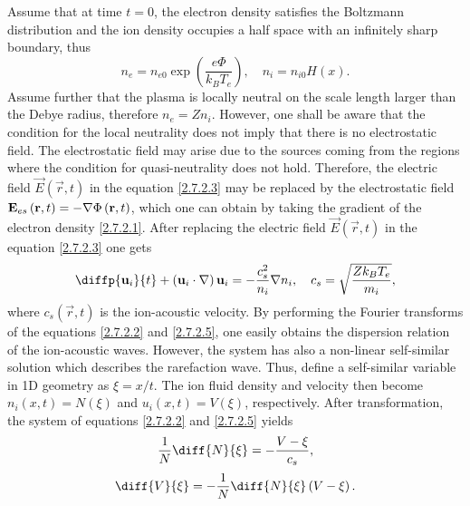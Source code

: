 Assume that at time $ t = 0 $, the electron density satisfies the Boltzmann distribution and the ion density occupies a half space with an infinitely sharp boundary, thus
\begin{equation}
\label{2.7.2.1}
n_e = n_{e0} \exp{\left( \frac{e \Phi}{k_B T_e} \right)}, \quad n_i = n_{i0} H(x).
\end{equation}
Assume further that the plasma is locally neutral on the scale length larger than the Debye radius, therefore $ n_e = Z n_i $. However, one shall be aware that the condition for the local neutrality does not imply that there is no electrostatic field. The electrostatic field may arise due to the sources coming from the regions where the condition for quasi-neutrality does not hold. Therefore, the electric field  $ \vec{E} \left(\vec{r}, t\right) $ in the equation \ref{2.7.2.3} may be replaced by the electrostatic field $ \mathbf{E}_{es} \left(\mathbf{r}, t\right) = -\nabla \Phi \left(\mathbf{r}, t\right) $, which one can obtain by taking the gradient of the electron density \ref{2.7.2.1}. After replacing the electric field $ \vec{E} \left(\vec{r}, t\right) $ in the equation \ref{2.7.2.3} one gets
\begin{equation}
\label{2.7.2.5}
\diffp{\vec{u}_i}{t} + \left(\vec{u}_i \cdot \grad{} \right) \vec{u}_i = - \frac{c_s^2}{n_i} \grad{n_i}, \quad c_s = \sqrt{\frac{Z k_B T_e}{m_i}},
\end{equation}
where $ c_s \left(\vec{r}, t\right) $ is the ion-acoustic velocity. By performing the Fourier transforms of the equations \ref{2.7.2.2} and \ref{2.7.2.5}, one easily obtains the dispersion relation of the ion-acoustic waves. However, the system has also a non-linear self-similar solution which describes the rarefaction wave. Thus, define a self-similar variable in 1D geometry as $ \xi = x/t $. The ion fluid density and velocity then become $ n_i \left(x, t\right) = N \left( \xi \right) $ and $ u_i \left(x, t\right) = V \left( \xi \right) $, respectively. After transformation, the system of equations \ref{2.7.2.2} and \ref{2.7.2.5} yields
\begin{equation}
\label{2.7.2.6}
\frac{1}{N} \diff{N}{\xi} = - \frac{V - \xi}{c_s},
\end{equation}
\begin{equation}
\label{2.7.2.7}
\diff{V}{\xi} = - \frac{1}{N} \diff{N}{\xi} \left(V - \xi \right).
\end{equation}

